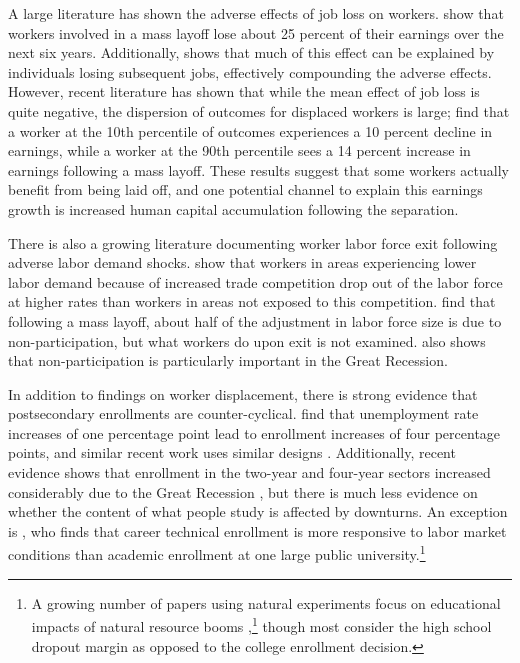 A large literature has shown the adverse effects of job loss on workers. \citet{JLS1993} show that workers involved in a mass layoff lose about 25 percent of their earnings over the next six years. Additionally, \citet{Stevens1997} shows that much of this effect can be explained by  individuals losing subsequent jobs, effectively compounding the adverse effects. However, recent literature has shown that while the mean effect of job loss is quite negative, the dispersion of outcomes for displaced workers is large; \citet{FHM2012} find that a worker at the 10th percentile of outcomes experiences a 10 percent decline in earnings, while a worker at the 90th percentile sees a 14 percent increase in earnings following a mass layoff. These results suggest that some workers actually benefit from being laid off, and one potential channel to explain this earnings growth is increased human capital accumulation following the separation.

There is also a growing literature documenting worker labor force exit following adverse labor demand shocks. \citet{ADH2013} show that workers in areas experiencing lower labor demand because of increased trade competition drop out of the labor force at higher rates than workers in areas not exposed to this competition. \citet{FGS2015} find that following a mass layoff, about half of the adjustment in labor force size is due to non-participation, but what workers do upon exit is not examined.  \citet{Yagan2016} also shows that non-participation is particularly important in the Great Recession.

In addition to findings on worker displacement, there is strong evidence that postsecondary enrollments are counter-cyclical. \citet{BF1995} find that unemployment rate increases of one percentage point lead to enrollment increases of four percentage points, and similar recent work uses similar designs \citep{HO2013, Nutting2008, clark2011}. Additionally, recent evidence shows that enrollment in the two-year and four-year sectors increased considerably due to the Great Recession \citep{BD2012}, but there is much less evidence on whether the content of what people study is affected by downturns. An exception is \citet{Nutting2008}, who finds that career technical enrollment is more responsive to labor market conditions than academic enrollment at one large public university.\footnote{A growing number of papers using natural experiments focus on educational impacts of natural resource booms \citep{Basso2016, BMS2005, MCL2015,CN2015},\footnote{\citet{Basso2016} also examines the effect of the bust following an oil boom.} though most consider the high school dropout margin as opposed to the college enrollment decision.}

